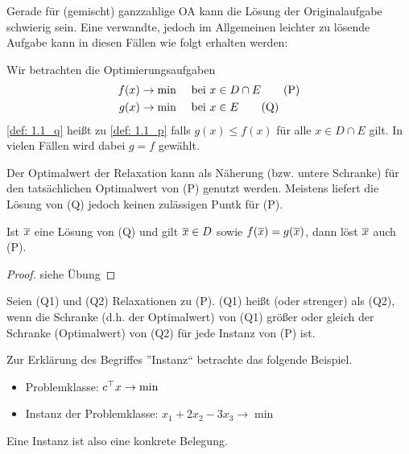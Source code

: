 Gerade für (gemischt) ganzzahlige OA kann die Lösung der Originalaufgabe schwierig sein. Eine verwandte, jedoch im Allgemeinen leichter zu lösende Aufgabe kann  in diesen Fällen wie folgt erhalten werden:

\begin{definition}
	Wir betrachten die Optimierungsaufgaben
	\begin{align}
		f(x) \to \min \quad &\text{ bei } x \in D \cap E \tag{P} \label{def: 1.1_p} \\
		g(x) \to \min \quad &\text{ bei } x \in E \tag{Q} \label{def: 1.1_q}
	\end{align}
	\eqref{def: 1.1_q} heißt  zu \eqref{def: 1.1_p} falls $g(x) \le f(x)$ für alle $x \in D \cap E$ gilt. In vielen Fällen wird dabei $g = f$ gewählt.
\end{definition}

Der Optimalwert der Relaxation kann als Näherung (bzw. untere Schranke) für den tatsächlichen Optimalwert von (P) genutzt werden. Meistens liefert die Lösung von (Q) jedoch keinen zulässigen Puntk für (P).

\begin{satz}
	Ist $\overline{x}$ eine Lösung von (Q) und gilt $\overline{x} \in D$ sowie $f(\overline{x}) = g(\overline{x})$, dann löst $\overline{x}$ auch (P).
\end{satz}
\begin{proof}
	siehe Übung
\end{proof}

\begin{definition}
	Seien (Q1) und (Q2) Relaxationen zu (P). (Q1) heißt  (oder strenger) als (Q2), wenn die Schranke (d.h. der Optimalwert) von (Q1) größer oder gleich der Schranke (Optimalwert) von (Q2) für jede Instanz von (P) ist.
\end{definition}

\begin{*anmerkung}
	Zur Erklärung des Begriffes ''Instanz`` betrachte das folgende Beispiel.
	\begin{itemize}[nolistsep, topsep=-\parskip]
		\item Problemklasse: $c^{\top} x \to \min$
		\item Instanz der Problemklasse: $x_1 + 2x_2 - 3x_3 \to \min$
	\end{itemize}
	Eine Instanz ist also eine konkrete Belegung.
\end{*anmerkung}